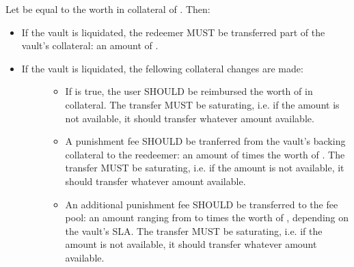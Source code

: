 \documentclass[a4paper,10pt,english]{sphinxmanual}
\begin{document}

Let  be equal to the worth in collateral of . Then:
\begin{itemize}
\item {} 
If the vault is liquidated, the redeemer MUST be transferred part of the vault’s collateral: an amount of  .

\item {} \begin{description}
\item[{If the vault is  liquidated, the fellowing collateral changes are made:}] \leavevmode\begin{itemize}
\item {} 
If  is true, the user SHOULD be reimbursed the worth of  in collateral. The transfer MUST be saturating, i.e. if the amount is not available, it should transfer whatever amount  available.

\item {} 
A punishment fee SHOULD be tranferred from the vault’s backing collateral to the reedeemer: an amount of {\hyperref[\detokenize{spec/fee:punishmentfee}]{}} times the worth of . The transfer MUST be saturating, i.e. if the amount is not available, it should transfer whatever amount  available.

\item {} 
An additional punishment fee SHOULD be transferred to the fee pool: an amount ranging from {\hyperref[\detokenize{spec/vault-registry:liquidationcollateralthreshold}]{}} to {\hyperref[\detokenize{spec/vault-registry:premiumcollateralthreshold}]{}} times the worth of , depending on the vault’s SLA. The transfer MUST be saturating, i.e. if the amount is not available, it should transfer whatever amount  available.

\end{itemize}


\end{description}
\end{itemize}
\end{document}
